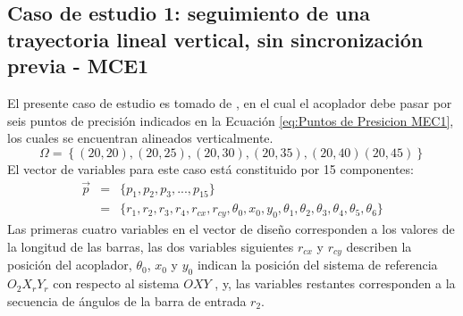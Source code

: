 \subsection{Caso de estudio 1: seguimiento de una trayectoria lineal vertical, sin
sincronización previa - MCE1}
El presente caso de estudio es tomado de \cite{VegaMEC1}, en el cual el acoplador debe pasar por
seis puntos de precisión indicados en la Ecuación \ref{eq:Puntos de Presicion MEC1}, los cuales se encuentran alineados verticalmente.
\begin{equation}\label{eq:Puntos de Presicion MEC1}
\Omega = \left \{ (20, 20), (20, 25), (20, 30), (20, 35), (20, 40) (20, 45)\right\} 
\end{equation}
El vector de variables para este caso está constituido por 15 componentes:
\begin{eqnarray}\label{eq:Vector variables MEC1}
\vec{p} &=& \{p_1,p_2,p_3,...,p_{15} \}\\
       &=& \{ r_1,r_2,r_3,r_4,r_{cx},r_{cy},\theta_0,x_0,y_0,\theta_1,\theta_2,\theta_3,\theta_4,\theta_5,\theta_6 \} 
\end{eqnarray}
Las primeras cuatro variables en el vector de diseño corresponden a los valores de la longitud de las barras, las dos variables siguientes $r_{cx}$ y $r_{cy}$ describen la posición del acoplador, $\theta_0$, $x_0$ y $y_0$ indican la posición del sistema de referencia $O_2X_rY_r$ con respecto al sistema $OXY$ , y, las variables restantes corresponden a la secuencia de ángulos de la barra de entrada $r_2$.

